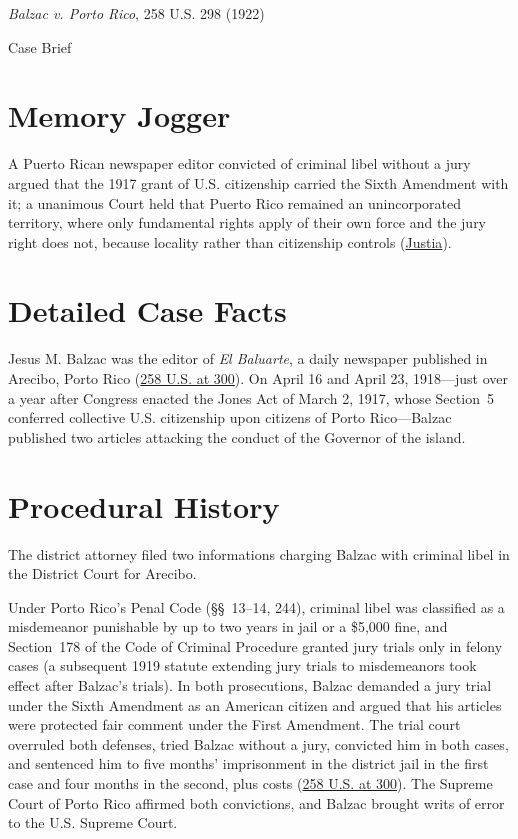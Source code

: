 \documentclass[12pt]{article}
\begin{document}
\begin{center}
{\LARGE \textit{Balzac v. Porto Rico}, 258 U.S. 298 (1922)\par}
\vspace{0.8em}
{\large Case Brief\par}
\end{center}
\vspace{1em}

\section{Memory Jogger}
A Puerto Rican newspaper editor convicted of criminal libel without a jury argued that the 1917 grant of U.S. citizenship carried the Sixth Amendment with it; a unanimous Court held that Puerto Rico remained an unincorporated territory, where only fundamental rights apply of their own force and the jury right does not, because locality rather than citizenship controls (\href{https://supreme.justia.com/cases/federal/us/258/298/}{Justia}).

\section{Detailed Case Facts}
Jesus M. Balzac was the editor of \textit{El Baluarte}, a daily newspaper published in Arecibo, Porto Rico (\href{https://supreme.justia.com/cases/federal/us/258/298/}{258 U.S. at 300}). On April 16 and April 23, 1918---just over a year after Congress enacted the Jones Act of March 2, 1917, whose Section~5 conferred collective U.S. citizenship upon citizens of Porto Rico---Balzac published two articles attacking the conduct of the Governor of the island.

\section{Procedural History}
The district attorney filed two informations charging Balzac with criminal libel in the District Court for Arecibo.

Under Porto Rico's Penal Code (\S\S~13--14, 244), criminal libel was classified as a misdemeanor punishable by up to two years in jail or a \$5,000 fine, and Section~178 of the Code of Criminal Procedure granted jury trials only in felony cases (a subsequent 1919 statute extending jury trials to misdemeanors took effect after Balzac's trials). In both prosecutions, Balzac demanded a jury trial under the Sixth Amendment as an American citizen and argued that his articles were protected fair comment under the First Amendment. The trial court overruled both defenses, tried Balzac without a jury, convicted him in both cases, and sentenced him to five months' imprisonment in the district jail in the first case and four months in the second, plus costs (\href{https://en.wikisource.org/wiki/Balzac_v._Porto_Rico/Opinion_of_the_Court}{258 U.S. at 300}). The Supreme Court of Porto Rico affirmed both convictions, and Balzac brought writs of error to the U.S. Supreme Court.
\end{document}

